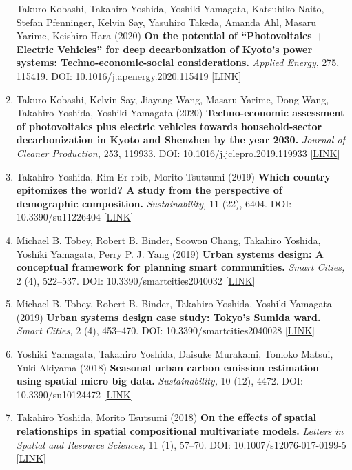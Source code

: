 \documentclass[
]{book}
\begin{document}
\begin{enumerate}
  Takuro Kobashi, Takahiro Yoshida, Yoshiki Yamagata, Katsuhiko Naito, Stefan Pfenninger, Kelvin Say, Yasuhiro Takeda, Amanda Ahl, Masaru Yarime, Keishiro Hara (2020)
  \textbf{On the potential of ``Photovoltaics + Electric Vehicles'' for deep decarbonization of Kyoto's power systems: Techno-economic-social considerations.}
  \emph{Applied Energy}, 275, 115419.
  DOI: 10.1016/j.apenergy.2020.115419 {[}\href{https://doi.org/10.1016/j.apenergy.2020.115419}{LINK}{]}
\item
  Takuro Kobashi, Kelvin Say, Jiayang Wang, Masaru Yarime, Dong Wang, Takahiro Yoshida, Yoshiki Yamagata (2020)
  \textbf{Techno-economic assessment of photovoltaics plus electric vehicles towards household-sector decarbonization in Kyoto and Shenzhen by the year 2030.}
  \emph{Journal of Cleaner Production,} 253, 119933.
  DOI: 10.1016/j.jclepro.2019.119933 {[}\href{https://doi.org/10.1016/j.jclepro.2019.119933}{LINK}{]}
\item
  Takahiro Yoshida, Rim Er-rbib, Morito Tsutsumi (2019)
  \textbf{Which country epitomizes the world? A study from the perspective of demographic composition.}
  \emph{Sustainability,} 11 (22), 6404.
  DOI: 10.3390/su11226404 {[}\href{https://www.mdpi.com/2071-1050/11/22/6404}{LINK}{]}
\item
  Michael B. Tobey, Robert B. Binder, Soowon Chang, Takahiro Yoshida, Yoshiki Yamagata, Perry P. J. Yang (2019)
  \textbf{Urban systems design: A conceptual framework for planning smart communities.}
  \emph{Smart Cities,} 2 (4), 522--537.
  DOI: 10.3390/smartcities2040032 {[}\href{https://www.mdpi.com/2624-6511/2/4/32}{LINK}{]}
\item
  Michael B. Tobey, Robert B. Binder, Takahiro Yoshida, Yoshiki Yamagata (2019)
  \textbf{Urban systems design case study: Tokyo's Sumida ward.}
  \emph{Smart Cities,} 2 (4), 453--470.
  DOI: 10.3390/smartcities2040028 {[}\href{https://www.mdpi.com/2624-6511/2/4/28}{LINK}{]}
\item
  Yoshiki Yamagata, Takahiro Yoshida, Daisuke Murakami, Tomoko Matsui, Yuki Akiyama (2018)
  \textbf{Seasonal urban carbon emission estimation using spatial micro big data.}
  \emph{Sustainability,} 10 (12), 4472.
  DOI: 10.3390/su10124472 {[}\href{https://www.mdpi.com/2071-1050/10/12/4472}{LINK}{]}
\item
  Takahiro Yoshida, Morito Tsutsumi (2018)
  \textbf{On the effects of spatial relationships in spatial compositional multivariate models.}
  \emph{Letters in Spatial and Resource Sciences,} 11 (1), 57--70.
  DOI: 10.1007/s12076-017-0199-5 {[}\href{https://link.springer.com/article/10.1007/s12076-017-0199-5}{LINK}{]}

\end{enumerate}
\end{document}
